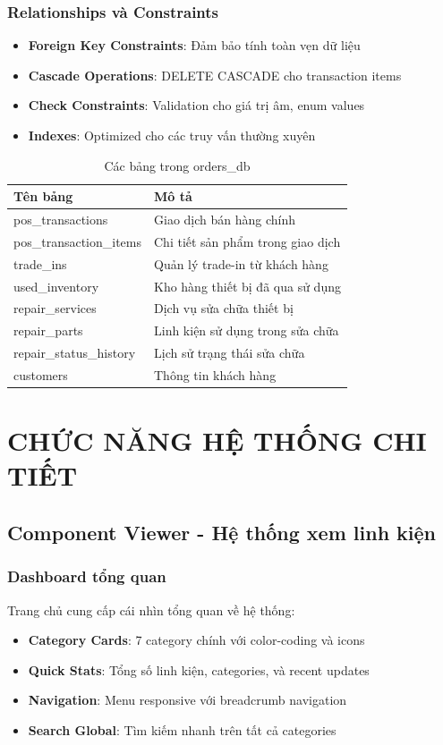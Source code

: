 \documentclass[12pt,a4paper]{article}
\begin{document}
\subsubsection{Relationships và Constraints}
\begin{itemize}
    \item \textbf{Foreign Key Constraints}: Đảm bảo tính toàn vẹn dữ liệu
    \item \textbf{Cascade Operations}: DELETE CASCADE cho transaction items
    \item \textbf{Check Constraints}: Validation cho giá trị âm, enum values
    \item \textbf{Indexes}: Optimized cho các truy vấn thường xuyên
\end{itemize}

\begin{table}[h]
\centering
\begin{tabular}{@{}ll@{}}
\toprule
\textbf{Tên bảng} & \textbf{Mô tả} \\
\midrule
pos\_transactions & Giao dịch bán hàng chính \\
pos\_transaction\_items & Chi tiết sản phẩm trong giao dịch \\
trade\_ins & Quản lý trade-in từ khách hàng \\
used\_inventory & Kho hàng thiết bị đã qua sử dụng \\
repair\_services & Dịch vụ sửa chữa thiết bị \\
repair\_parts & Linh kiện sử dụng trong sửa chữa \\
repair\_status\_history & Lịch sử trạng thái sửa chữa \\
customers & Thông tin khách hàng \\
\bottomrule
\end{tabular}
\caption{Các bảng trong orders\_db}
\end{table}

\section{CHỨC NĂNG HỆ THỐNG CHI TIẾT}

\subsection{Component Viewer - Hệ thống xem linh kiện}
\subsubsection{Dashboard tổng quan}
Trang chủ cung cấp cái nhìn tổng quan về hệ thống:
\begin{itemize}
    \item \textbf{Category Cards}: 7 category chính với color-coding và icons
    \item \textbf{Quick Stats}: Tổng số linh kiện, categories, và recent updates
    \item \textbf{Navigation}: Menu responsive với breadcrumb navigation
    \item \textbf{Search Global}: Tìm kiếm nhanh trên tất cả categories
\end{itemize}
\end{document}
